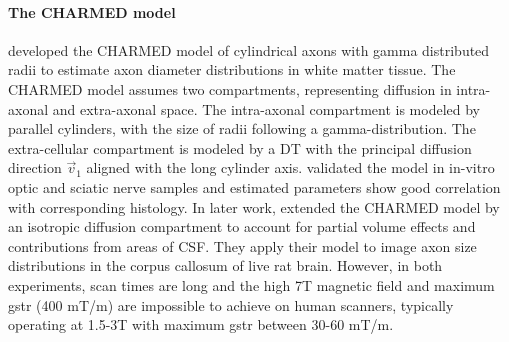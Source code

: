 \paragraph*{The CHARMED model} 
\citet{Assaf:2005} developed the CHARMED model of cylindrical axons with gamma distributed radii to estimate axon diameter distributions in white matter tissue. The CHARMED model assumes two compartments, representing diffusion in intra-axonal and extra-axonal space. The intra-axonal compartment is modeled by parallel cylinders, with the size of radii following a gamma-distribution. The extra-cellular compartment is modeled by a {\gls{DT}} with the principal diffusion direction $\vec{v}_1$ aligned with the long cylinder axis. \citet{Alexander:2008} validated the model in in-vitro optic and sciatic nerve samples and estimated parameters show good correlation with corresponding histology. In later work, \citet{Barazany:2009} extended the CHARMED model by an isotropic diffusion compartment to account for partial volume effects and contributions from areas of {\gls{CSF}}. They apply their model to image axon size distributions in the corpus callosum of live rat brain. However, in both experiments, scan times are long and the high 7T magnetic field and maximum {\gls{gstr}} (400 mT/m) are impossible to achieve on human scanners, typically operating at 1.5-3T with maximum {\gls{gstr}} between 30-60 mT/m.

